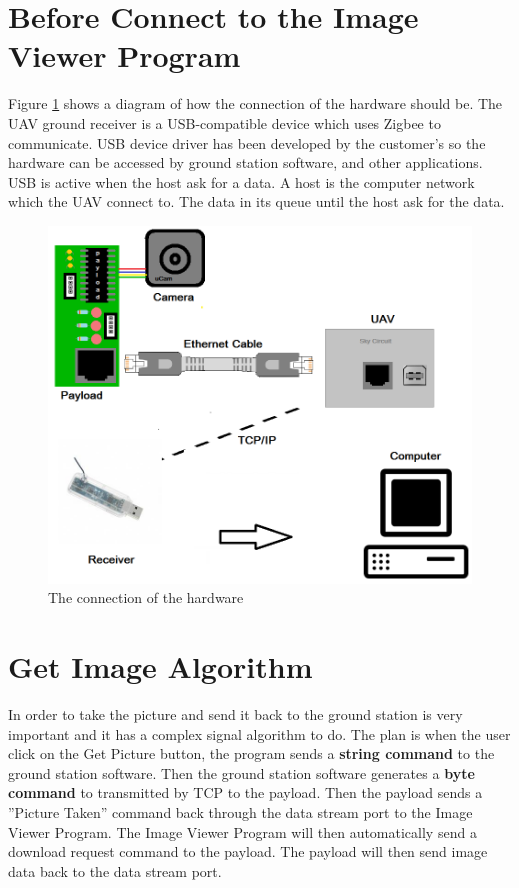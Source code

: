 \section{Before Connect to the Image Viewer Program}
Figure \ref{schemetic_clipA} shows a diagram of how the connection of the hardware should be. 
The UAV ground receiver is a USB-compatible device which uses Zigbee to communicate. 
USB device driver has been developed by the customer’s so the hardware can be accessed by ground station software, and other applications. 
USB is active when the host ask for a data. 
A host is the computer network which the UAV connect to. 
The data in its queue until the host ask for the data. 
\begin{figure}[!hbtp]
\begin{center}
\includegraphics[scale=0.4]{figures/clipArt.png} 
\end{center}
\caption{The connection of the hardware\label{schemetic_clipA}}
\end{figure}

\section{Get Image Algorithm}
\label{get image algorithm}
In order to take the picture and send it back to the ground station is very important and it has a complex signal algorithm to do.
The plan is when the user click on the Get Picture button, the program sends a \textbf{string command} to the ground station software.
Then the ground station software generates a \textbf{byte command} to transmitted by TCP to the payload. 
Then the payload sends a ''Picture Taken'' command back through the data stream port to the Image Viewer Program. 
The Image Viewer Program will then automatically send a download request command to the payload. 
The payload will then send image data back to the data stream port. 

